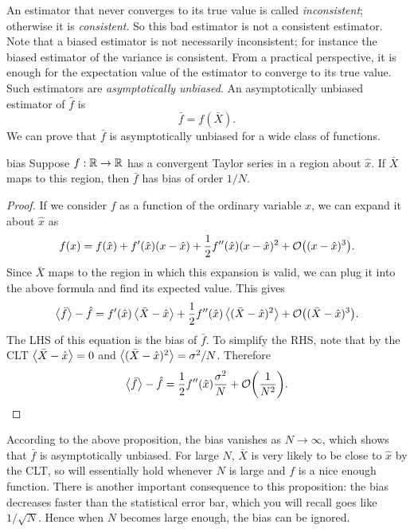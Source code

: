 An estimator that never converges to its true value is called
{\it inconsistent}; otherwise it is {\it consistent}.
So this bad estimator is not a consistent estimator. Note that a biased
estimator is not necessarily inconsistent; for instance the biased estimator
of the variance  is consistent. From a practical perspective,
it is enough for the expectation value of the estimator to converge to its true
value. Such estimators are {\it asymptotically unbiased}. An asymptotically unbiased estimator of $\hat{f}$ is
\begin{equation}\label{eq:consistentEstimator}
  \bar{f}=f(\bar{X}).
\end{equation} 
We can prove that $\bar{f}$ is asymptotically unbiased for a wide class of functions.
\begin{proposition}{}{bias}
  Suppose $f:\mathbb{R}\to\mathbb{R}$ has a convergent Taylor series 
  in a region about $\hat{x}$. If $\bar{X}$ maps to this region, 
  then $\bar{f}$ has bias of order $1/N$.
  \begin{proof}
    If we consider $f$ as a function of the ordinary variable $x$, we can
    expand it about $\hat{x}$ as
    $$
      f(x)=f(\hat{x})+f'(\hat{x})(x-\hat{x})
           +\frac{1}{2}f''(\hat{x})(x-\hat{x})^2
           +\order{(x-\hat{x})^3}.
    $$
    Since $\bar{X}$ maps to the region in which this expansion is valid,
    we can plug it into the above formula and find its expected value.
    This gives
    $$
      \ev{\bar{f}}-\hat{f}=f'(\hat{x})\ev{\bar{X}-\hat{x}}
           +\frac{1}{2}f''(\hat{x})\ev{(\bar{X}-\hat{x})^2}
           +\order{(\bar{X}-\hat{x})^3}.
    $$
    The LHS of this equation is the bias of $\bar{f}$. To simplify the
    RHS, note that by the CLT $\ev{\bar{X}-\hat{x}}=0$ and
    $\ev{(\bar{X}-\hat{x})^2}=\sigma^2/N$. Therefore
    $$
      \ev{\bar{f}}-\hat{f}=\frac{1}{2}f''(\hat{x})\frac{\sigma^2}{N}
                           +\order{\frac{1}{N^2}}.
    $$
  \end{proof}
\end{proposition}
According to the above proposition, the bias vanishes as $N\to\infty$, which
shows that $\bar{f}$ is asymptotically unbiased. For large $N$, $\bar{X}$ is very likely
to be close to $\hat{x}$ by the CLT, so  will 
essentially hold whenever $N$ is large and $f$ is a nice enough function.
There is another important consequence to this proposition: the bias
decreases faster than the statistical error bar, which you will recall
goes like $1/\sqrt{N}$. Hence when $N$ becomes large enough, the bias
can be ignored.

